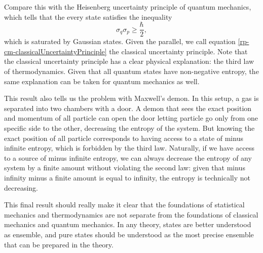 Compare this with the Heisenberg uncertainty principle of quantum mechanics, which tells that the every state satisfies the inequality
\begin{equation}
	\sigma_q \sigma_p \geq \frac{\hbar}{2},
\end{equation}
which is saturated by Gaussian states. Given the parallel, we call equation \ref{rp-cm-classicalUncertaintyPrinciple} the classical uncertainty principle. Note that the classical uncertainty principle has a clear physical explanation: the third law of thermodynamics. Given that all quantum states have non-negative entropy, the same explanation can be taken for quantum mechanics as well.

This result also tells us the problem with Maxwell's demon. In this setup, a gas is separated into two chambers with a door. A demon that sees the exact position and momentum of all particle can open the door letting particle go only from one specific side to the other, decreasing the entropy of the system. But knowing the exact position of all particle corresponds to having access to a state of minus infinite entropy, which is forbidden by the third law. Naturally, if we have access to a source of minus infinite entropy, we can always decrease the entropy of any system by a finite amount without violating the second law: given that minus infinity minus a finite amount is equal to infinity, the entropy is technically not decreasing.

This final result should really make it clear that the foundations of statistical mechanics and thermodynamics are not separate from the foundations of classical mechanics and quantum mechanics. In any theory, states are better understood as ensemble, and pure states should be understood as the most precise ensemble that can be prepared in the theory.

